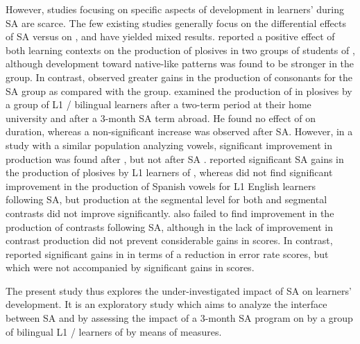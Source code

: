 \documentclass[output=paper]{langsci/langscibook}
\begin{document}
However, studies focusing on specific aspects of  development in learners’   during SA are scarce. The few existing studies generally focus on the differential effects of SA versus  on  , and have yielded mixed results. \citet{Díaz-Campos2004} reported a positive effect of both learning contexts on the production of  plosives in two groups of  students of , although development toward native-like patterns was found to be stronger in the  group. In contrast, \citet{Díaz-Campos2006} observed greater gains in the production of  consonants for the SA group as compared with the  group. \citet{Mora2008} examined the production of  in   plosives by a group of L1 / bilingual learners after a two-term  period at their home university and after a 3-month SA term abroad. He found no effect of  on  duration, whereas a non-significant increase was observed after SA. However, in a study with a similar population analyzing  vowels, significant improvement in production was found after , but not after SA \citep{Pérez-VidalEtAl2011}. \cite{SanzEtAl2013} reported significant SA gains in the production of  plosives by L1  learners of , whereas \cite{Simões1996}  did not find significant improvement in the production of Spanish vowels for L1 English learners following SA, but production at the segmental level for both  and segmental contrasts did not improve significantly. \citet{Avello2010a} also failed to find improvement in the production of  contrasts following SA, although in \citet{Avello2010b} the lack of improvement in  contrast production did not prevent considerable gains in  scores. In contrast, \citet{AvelloEtAl2012} reported significant gains in  in terms of a reduction in error rate scores, but which were not accompanied by significant gains in  scores.

The present study thus explores the under-investigated impact of SA on  learners’  development. It is an exploratory study which aims to analyze the interface between SA and  by assessing the impact of a 3-month SA program on   by a group of bilingual L1 / learners of   by means of  measures.
\end{document}
